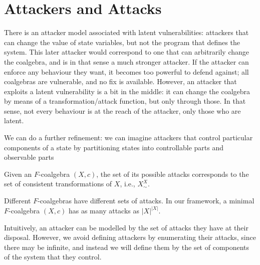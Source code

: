 
 
\section{Attackers and Attacks}
There is an attacker model associated with latent vulnerabilities: attackers that can change the value of state variables, but not the program that defines the system. This later attacker would correspond to one that can arbitrarily change the coalgebra, and is in that sense a much stronger attacker. If the attacker can enforce any behaviour they want, it becomes too powerful to defend against; all coalgebras are vulnerable, and no fix is available. However, an attacker that exploits a latent vulnerability is a bit in the middle: it can change the coalgebra by means of a transformation/attack function, but only through those. In that sense, not every behaviour is at the reach of the attacker, only those who are latent.

We can do a further refinement: we can imagine attackers that control particular components of a state by partitioning states into controllable parts and observable parts

\begin{definition}[Attack]
Given an $F$-coalgebra $(X,c)$, the set of its possible attacks corresponds to the set of consistent transformations of $X$, i.e., $X^X_\sim$. 
\end{definition}
Different $F$-coalgebras have different sets of attacks. In our framework, a minimal $F$-coalgebra $(X,c)$ has as many attacks as $|X|^{|X|}$.

Intuitively, an attacker can be modelled by the set of attacks they have at their disposal. However, we avoid defining attackers by enumerating their attacks, since there may be infinite, and instead we will define them by the set of components of the system that they control. 

